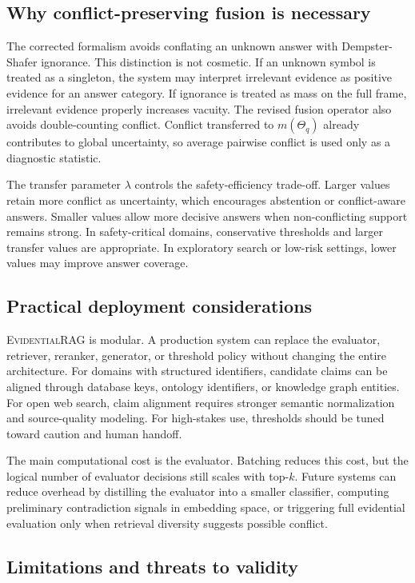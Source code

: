 \documentclass[preprint,12pt,authoryear,nopreprintline]{elsarticle}
\newcommand{\Frame}{\Theta}
\newcommand{\ERAG}{\textsc{EvidentialRAG}}
\begin{document}
\subsection{Why conflict-preserving fusion is necessary}

The corrected formalism avoids conflating an unknown answer with Dempster-Shafer ignorance. This distinction is not cosmetic. If an unknown symbol is treated as a singleton, the system may interpret irrelevant evidence as positive evidence for an answer category. If ignorance is treated as mass on the full frame, irrelevant evidence properly increases vacuity. The revised fusion operator also avoids double-counting conflict. Conflict transferred to $m(\Frame_q)$ already contributes to global uncertainty, so average pairwise conflict is used only as a diagnostic statistic.

The transfer parameter $\lambda$ controls the safety-efficiency trade-off. Larger values retain more conflict as uncertainty, which encourages abstention or conflict-aware answers. Smaller values allow more decisive answers when non-conflicting support remains strong. In safety-critical domains, conservative thresholds and larger transfer values are appropriate. In exploratory search or low-risk settings, lower values may improve answer coverage.

\subsection{Practical deployment considerations}

\ERAG{} is modular. A production system can replace the evaluator, retriever, reranker, generator, or threshold policy without changing the entire architecture. For domains with structured identifiers, candidate claims can be aligned through database keys, ontology identifiers, or knowledge graph entities. For open web search, claim alignment requires stronger semantic normalization and source-quality modeling. For high-stakes use, thresholds should be tuned toward caution and human handoff.

The main computational cost is the evaluator. Batching reduces this cost, but the logical number of evaluator decisions still scales with top-$k$. Future systems can reduce overhead by distilling the evaluator into a smaller classifier, computing preliminary contradiction signals in embedding space, or triggering full evidential evaluation only when retrieval diversity suggests possible conflict.

\subsection{Limitations and threats to validity}
\end{document}
